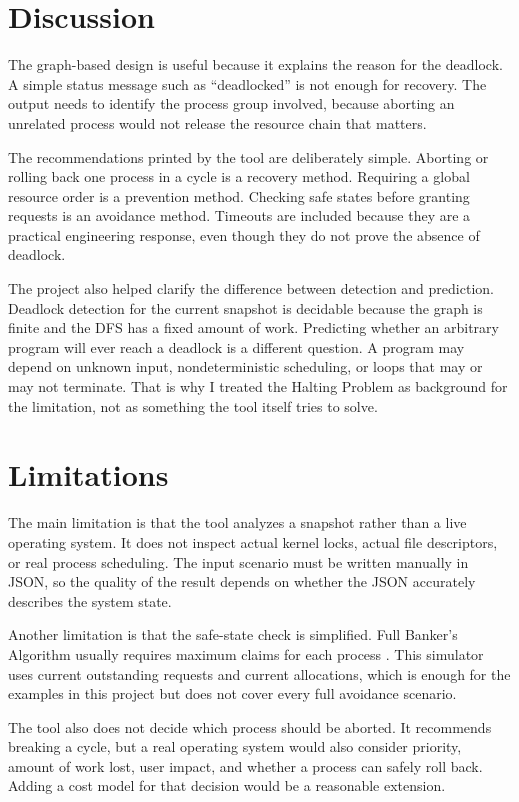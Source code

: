 \documentclass[10pt]{article}
\begin{document}
\section{Discussion}

The graph-based design is useful because it explains the reason for the deadlock. A simple status message such as ``deadlocked'' is not enough for recovery. The output needs to identify the process group involved, because aborting an unrelated process would not release the resource chain that matters.

The recommendations printed by the tool are deliberately simple. Aborting or rolling back one process in a cycle is a recovery method. Requiring a global resource order is a prevention method. Checking safe states before granting requests is an avoidance method. Timeouts are included because they are a practical engineering response, even though they do not prove the absence of deadlock.

The project also helped clarify the difference between detection and prediction. Deadlock detection for the current snapshot is decidable because the graph is finite and the DFS has a fixed amount of work. Predicting whether an arbitrary program will ever reach a deadlock is a different question. A program may depend on unknown input, nondeterministic scheduling, or loops that may or may not terminate. That is why I treated the Halting Problem as background for the limitation, not as something the tool itself tries to solve.

\section{Limitations}

The main limitation is that the tool analyzes a snapshot rather than a live operating system. It does not inspect actual kernel locks, actual file descriptors, or real process scheduling. The input scenario must be written manually in JSON, so the quality of the result depends on whether the JSON accurately describes the system state.

Another limitation is that the safe-state check is simplified. Full Banker's Algorithm usually requires maximum claims for each process \cite{osc}. This simulator uses current outstanding requests and current allocations, which is enough for the examples in this project but does not cover every full avoidance scenario.

The tool also does not decide which process should be aborted. It recommends breaking a cycle, but a real operating system would also consider priority, amount of work lost, user impact, and whether a process can safely roll back. Adding a cost model for that decision would be a reasonable extension.
\end{document}
